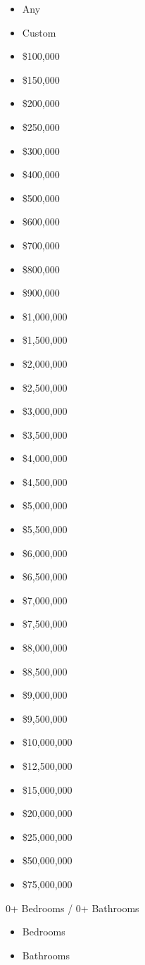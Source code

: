 \begin{itemize}
\tightlist
\item
  Any
\item
  Custom
\item
  \$100,000
\item
  \$150,000
\item
  \$200,000
\item
  \$250,000
\item
  \$300,000
\item
  \$400,000
\item
  \$500,000
\item
  \$600,000
\item
  \$700,000
\item
  \$800,000
\item
  \$900,000
\item
  \$1,000,000
\item
  \$1,500,000
\item
  \$2,000,000
\item
  \$2,500,000
\item
  \$3,000,000
\item
  \$3,500,000
\item
  \$4,000,000
\item
  \$4,500,000
\item
  \$5,000,000
\item
  \$5,500,000
\item
  \$6,000,000
\item
  \$6,500,000
\item
  \$7,000,000
\item
  \$7,500,000
\item
  \$8,000,000
\item
  \$8,500,000
\item
  \$9,000,000
\item
  \$9,500,000
\item
  \$10,000,000
\item
  \$12,500,000
\item
  \$15,000,000
\item
  \$20,000,000
\item
  \$25,000,000
\item
  \$50,000,000
\item
  \$75,000,000
\end{itemize}

0+ Bedrooms / 0+ Bathrooms

\begin{itemize}
\tightlist
\item
  Bedrooms
\item
  Bathrooms
\end{itemize}


